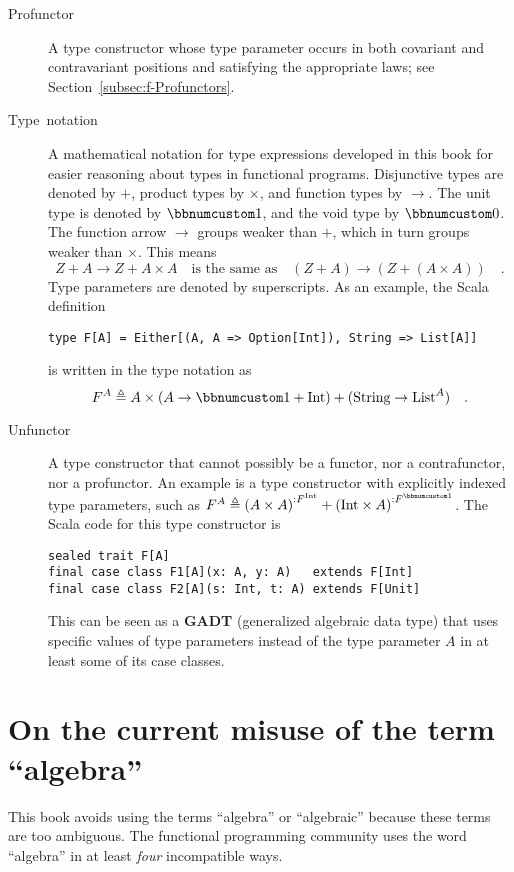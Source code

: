 \begin{description}
\item [{Profunctor}] A type constructor whose type parameter
occurs in both covariant and contravariant positions and satisfying
the appropriate laws; see Section~\ref{subsec:f-Profunctors}.
\item [{Type~notation}] A mathematical notation
for type expressions developed in this book for easier reasoning about
types in functional programs. Disjunctive types are denoted by $+$,
product types by $\times$, and function types by $\rightarrow$.
The unit type is denoted by $\bbnum 1$, and the void type by $\bbnum 0$.
The function arrow $\rightarrow$ groups weaker than $+$, which in
turn groups weaker than $\times$. This means
\[
Z+A\rightarrow Z+A\times A\quad\text{is the same as}\quad\left(Z+A\right)\rightarrow\left(Z+\left(A\times A\right)\right)\quad.
\]
 Type parameters are denoted by superscripts. As an example, the Scala
definition\texttt{}
\begin{lstlisting}
type F[A] = Either[(A, A => Option[Int]), String => List[A]]
\end{lstlisting}
is written in the type notation as 
\[
F^{A}\triangleq A\times\left(A\rightarrow\bbnum 1+\text{Int}\right)+(\text{String}\rightarrow\text{List}^{A})\quad.
\]
\item [{Unfunctor}] A type constructor that cannot possibly
be a functor, nor a contrafunctor, nor a profunctor. An example is
a type constructor with explicitly indexed type parameters, such as
$F^{A}\triangleq\left(A\times A\right)^{:F^{\text{Int}}}+\left(\text{Int}\times A\right)^{:F^{\bbnum 1}}$.
The Scala code for this type constructor is
\begin{lstlisting}
sealed trait F[A]
final case class F1[A](x: A, y: A)   extends F[Int]
final case class F2[A](s: Int, t: A) extends F[Unit]
\end{lstlisting}
This can be seen as a \textbf{GADT}
(generalized algebraic data type) that uses specific values of type
parameters instead of the type parameter $A$ in at least some of
its case classes.
\end{description}

\section{On the current misuse of the term \textsf{``}algebra\textsf{''}}

This book avoids using the terms \textsf{``}algebra\textsf{''} or
\textsf{``}algebraic\textsf{''} because these terms are too ambiguous.
The functional programming community uses the word \textsf{``}algebra\textsf{''} in
at least \emph{four} incompatible ways.

